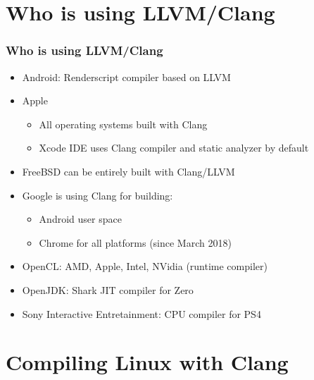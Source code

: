 \documentclass{beamer}
\begin{document}
\section{Who is using LLVM/Clang}

\begin{frame}
\frametitle{Who is using LLVM/Clang}
\begin{itemize}
  \item Android: Renderscript compiler based on LLVM
  \item Apple
  \begin{itemize}
    \item All operating systems built with Clang
    \item Xcode IDE uses Clang compiler and static analyzer by default
  \end{itemize}
  \item FreeBSD can be entirely built with Clang/LLVM
  \item Google is using Clang for building:
  \begin{itemize}
    \item Android user space
    \item Chrome for all platforms (since March 2018)
  \end{itemize}
  \item OpenCL: AMD, Apple, Intel, NVidia (runtime compiler)
  \item OpenJDK: Shark JIT compiler for Zero
  \item Sony Interactive Entretainment: CPU compiler for PS4
\end{itemize}
\end{frame}
\section{Compiling Linux with Clang}
\end{document}
